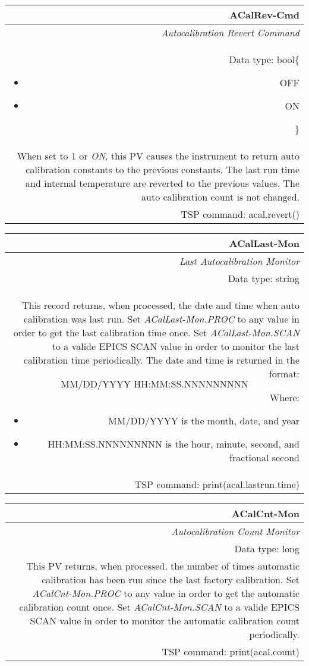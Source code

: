 \documentclass[openany]{article}
\begin{document}
		\begin{tabular}{N}
			\hline
			\bfseries ACalRev-Cmd\label{pv:acalrev-cmd} \\ \hline
			\emph{Autocalibration Revert Command} \\
			Data type: bool\{\begin{itemize}[noitemsep]
				\small
				\item[] OFF
				\item[] ON
			\end{itemize}\} \\
			When set to 1 or \emph{ON}, this PV causes the instrument to return auto calibration constants to the previous constants. The last run time and internal temperature are reverted to the previous values. The auto calibration
count is not changed. \\
			TSP command: acal.revert()
		\end{tabular}

		\begin{tabular}{N}
			\hline
			\bfseries ACalLast-Mon\label{pv:acallast-mon} \\ \hline
			\emph{Last Autocalibration Monitor} \\
			Data type: string \\
			This record returns, when processed, the date and time when auto calibration was last run. Set \emph{ACalLast-Mon.PROC} to any value in order to get the last calibration time once. Set \emph{ACalLast-Mon.SCAN} to a valide EPICS SCAN value in order to monitor the last calibration time periodically. The date and time is returned in the format: $$ \text{MM/DD/YYYY HH:MM:SS.NNNNNNNNN} $$ Where: \begin{itemize} \item MM/DD/YYYY is the month, date, and year \item HH:MM:SS.NNNNNNNNN is the hour, minute, second, and fractional second \end{itemize} \\
			TSP command: print(acal.lastrun.time)
		\end{tabular}

		\begin{tabular}{N}
			\hline
			\bfseries ACalCnt-Mon\label{pv:acalcount-mon} \\ \hline
			\emph{Autocalibration Count Monitor} \\
			Data type: long \\
			This PV returns, when processed, the number of times automatic calibration has been run since the last factory calibration. Set \emph{ACalCnt-Mon.PROC} to any value in order to get the automatic calibration count once. Set \emph{ACalCnt-Mon.SCAN} to a valide EPICS SCAN value in order to monitor the automatic calibration count periodically. \\
			TSP command: print(acal.count)
		\end{tabular}
\end{document}
